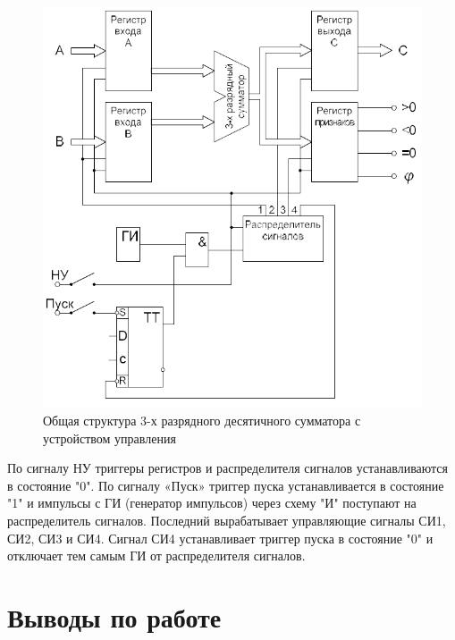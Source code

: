 \documentclass[a4paper,14pt]{article}
\begin{document}
\begin{figure}[H]
	\centering
	\includegraphics[width=1\linewidth]{images/itog_sh}
	\caption{Общая структура 3-х разрядного десятичного сумматора с устройством	управления}
	\label{fig:itog_sh}
\end{figure}

По сигналу НУ триггеры регистров и распределителя сигналов
устанавливаются в состояние "0". По сигналу «Пуск» триггер пуска
устанавливается в состояние "1" и импульсы с ГИ (генератор импульсов)
через схему "И" поступают на распределитель сигналов. Последний
вырабатывает управляющие сигналы СИ1, СИ2, СИ3 и СИ4. Сигнал СИ4
устанавливает триггер пуска в состояние "0" и отключает тем самым ГИ от
распределителя сигналов.


\section{Выводы по работе}
\end{document}
